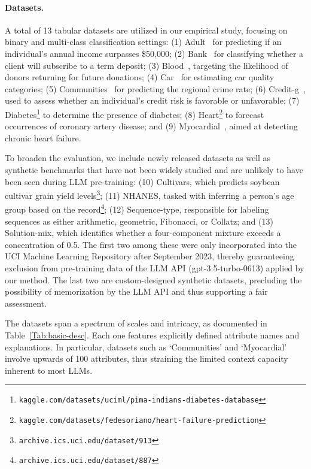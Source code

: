 \paragraph{Datasets.}
A total of 13 tabular datasets are utilized in our empirical study, focusing on binary and multi-class classification settings: (1) Adult~\cite{asuncion2007uci} for predicting if an individual's annual income surpasses \$50,000; (2) Bank~\cite{moro2014data} for classifying whether a client will subscribe to a term deposit; (3) Blood~\cite{yeh2009knowledge}, targeting the likelihood of donors returning for future donations; (4) Car~\cite{kadra2021well} for estimating car quality categories; (5) Communities~\cite{misc_communities_and_crime_183} for predicting the regional crime rate; (6) Credit-g~\cite{kadra2021well}, used to assess whether an individual's credit risk is favorable or unfavorable; (7) Diabetes\footnote{\texttt{kaggle.com/datasets/uciml/pima-indians-diabetes-database}} to determine the presence of diabetes; (8) Heart\footnote{\texttt{kaggle.com/datasets/fedesoriano/heart-failure-prediction}} to forecast occurrences of coronary artery disease; and (9) Myocardial~\cite{misc_myocardial_infarction_complications_579}, aimed at detecting chronic heart failure.

To broaden the evaluation, we include newly released datasets as well as synthetic benchmarks that have not been widely studied and are unlikely to have been seen during LLM pre-training: (10) Cultivars, which predicts soybean cultivar grain yield levels\footnote{\texttt{archive.ics.uci.edu/dataset/913}}; (11) NHANES, tasked with inferring a person’s age group based on the record\footnote{\texttt{archive.ics.uci.edu/dataset/887}}; (12) Sequence-type, responsible for labeling sequences as either arithmetic, geometric, Fibonacci, or Collatz; and (13) Solution-mix, which identifies whether a four-component mixture exceeds a concentration of 0.5. The first two among these were only incorporated into the UCI Machine Learning Repository after September 2023, thereby guaranteeing exclusion from pre-training data of the LLM API (gpt-3.5-turbo-0613) applied by our method. The last two are custom-designed synthetic datasets, precluding the possibility of memorization by the LLM API and thus supporting a fair assessment.

The datasets span a spectrum of scales and intricacy, as documented in Table~\ref{Tab:basic-desc}. Each one features explicitly defined attribute names and explanations. In particular, datasets such as `Communities' and `Myocardial' involve upwards of 100 attributes, thus straining the limited context capacity inherent to most LLMs.

